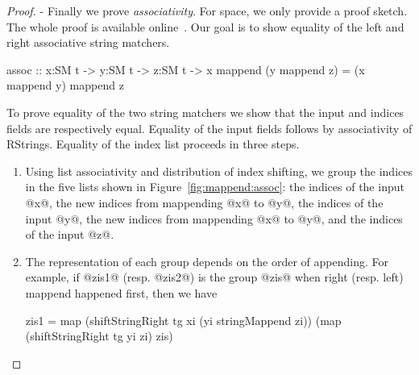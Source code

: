 \begin{proof}
- Finally we prove \textit{associativity}.
For space, we only provide a proof sketch.
The whole proof is available online~\cite{implementation}.
%
Our goal is to show equality of the left and right associative string matchers.
%
\begin{code}
  assoc :: x:SM t -> y:SM t -> z:SM t
        -> {x mappend (y mappend z) = (x mappend y) mappend z}
\end{code}
To prove equality of the two string matchers we show
that the input and indices fields are respectively equal.
%
Equality of the input fields follows by associativity of RStrings.
%
Equality of the index list proceeds in three steps.
%
\begin{enumerate}
\item Using list associativity and distribution of index shifting,
we group the indices in the five lists shown in
Figure~\ref{fig:mappend:assoc}: the indices of the input @x@, the new
indices from mappending @x@ to @y@, the indices of the input @y@, the
new indices from mappending @x@ to @y@, and the indices of the input
@z@.
\item The representation of each group depends on the order of appending.
For example, if @zis1@ (resp. @zis2@) is the group @zis@ when
right (resp. left) mappend happened first, then we have
\begin{code}
  zis1 = map (shiftStringRight tg xi (yi stringMappend zi))
             (map (shiftStringRight tg yi zi) zis)


\end{code}
\end{enumerate}
\end{proof}
